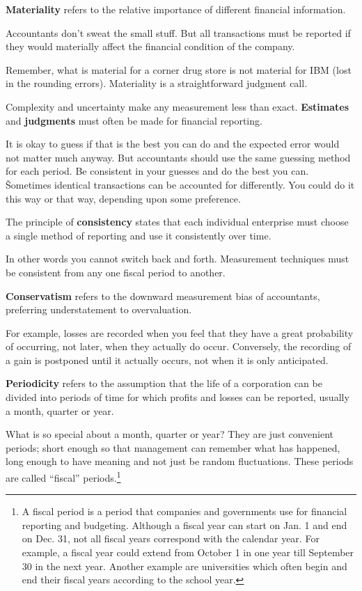 \bd[Materiality]
\textbf{Materiality} refers to the relative importance of different financial information.
\ed

Accountants don't sweat the small stuff. But all transactions must be reported if they would materially affect the
financial condition of the company.

\be
Remember, what is material for a corner drug store is not material for IBM (lost in the rounding errors). Materiality
is a straightforward judgment call.
\ee

Complexity and uncertainty make any measurement less than exact. \textbf{Estimates} and \textbf{judgments} must often
be made for financial reporting.
\ed

It is okay to guess if that is the best you can do and the expected error would not matter much anyway. But accountants
should use the same guessing method for each period. Be consistent in your guesses and do the best you can. \v

Sometimes identical transactions can be accounted for differently. You could do it this way or that way, depending upon
some preference.

\bd[Consistency]
The principle of \textbf{consistency} states that each individual enterprise must choose a single method of reporting
and use it consistently over time.
\ed

In other words you cannot switch back and forth. Measurement techniques must be consistent from any one fiscal period
to another.

\bd[Conservatism]
\textbf{Conservatism} refers to the downward measurement bias of accountants, preferring understatement to
overvaluation.
\ed

\be
For example, losses are recorded when you feel that they have a great probability of occurring, not later, when they
actually do occur. Conversely, the recording of a gain is postponed until it actually occurs, not when it is only
anticipated.
\ee

\bd[Periodicity]
\textbf{Periodicity} refers to the assumption that the life of a corporation can be divided into periods of time for
which profits and losses can be reported, usually a month, quarter or year.
\ed

What is so special about a month, quarter or year? They are just convenient periods; short enough so that management
can remember what has happened, long enough to have meaning and not just be random fluctuations. These periods are
called ``fiscal'' periods.\footnote{A fiscal period is a period that companies and governments use for financial
reporting and budgeting. Although a fiscal year can start on Jan. 1 and end on Dec. 31, not all fiscal years
correspond with the calendar year. For example, a fiscal year could extend from October 1 in one year till September
30 in the next year. Another example are universities which often begin and end their fiscal years according to the
school year.}

